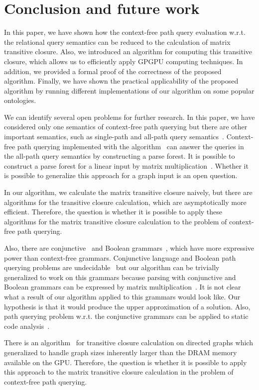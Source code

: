 \section{Conclusion and future work}
In this paper, we have shown how the context-free path query evaluation w.r.t. the relational query semantics can be reduced to the calculation of matrix transitive closure. Also, we introduced an algorithm for computing this transitive closure, which allows us to efficiently apply GPGPU computing techniques. In addition, we provided a formal proof of the correctness of the proposed algorithm. Finally, we have shown the practical applicability of the proposed algorithm by running different implementations of our algorithm on some popular ontologies.

We can identify several open problems for further research. In this paper, we have considered only one semantics of context-free path querying but there are other important semantics, such as single-path and all-path query semantics~\cite{hellingsPathQuerying}. Context-free path querying implemented with the algorithm~\cite{GLL} can answer the queries in the all-path query semantics by constructing a parse forest. It is possible to construct a parse forest for a linear input by matrix multiplication~\cite{okhotin_cyk}. Whether it is possible to generalize this approach for a graph input is an open question.

In our algorithm, we calculate the matrix transitive closure naively, but there are algorithms for the transitive closure calculation, which are asymptotically more efficient. Therefore, the question is whether it is possible to apply these algorithms for the matrix transitive closure calculation to the problem of context-free path querying.

Also, there are conjunctive~\cite{okhotinConjAndBool} and Boolean grammars~\cite{okhotinBoolean}, which have more expressive power than context-free grammars. Conjunctive language and Boolean path querying problems are undecidable~\cite{hellingsRelational} but our algorithm can be trivially generalized to work on this grammars because parsing with conjunctive and Boolean grammars can be expressed by matrix multiplication~\cite{okhotin_cyk}. It is not clear what a result of our algorithm applied to this grammars would look like. Our hypothesis is that it would produce the upper approximation of a solution. Also, path querying problem w.r.t. the conjunctive grammars can be applied to static code analysis~\cite{zhang2017context}.

There is an algorithm~\cite{apspGPU} for transitive closure calculation on directed graphs which generalized to handle graph sizes inherently larger than the DRAM memory available on the GPU. Therefore, the question is whether it is possible to apply this approach to the matrix transitive closure calculation in the problem of context-free path querying.
